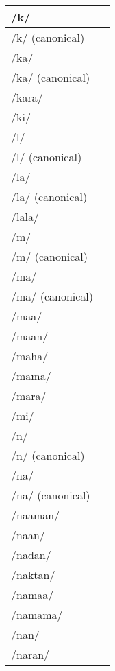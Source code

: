 \documentclass{article}
\begin{document}
\begin{longtable}{|l|p{}|}
/k/ & \textIndus{} \\ \hline
/k/ (canonical) & \textIndus{} \\ \hline
/ka/ & \textIndus{} \\ \hline
/ka/ (canonical) & \textIndus{} \\ \hline
/kara/ & \textIndus{} \\ \hline
/ki/ & \textIndus{} \\ \hline
/l/ & \textIndus{} \\ \hline
/l/ (canonical) & \textIndus{} \\ \hline
/la/ & \textIndus{} \\ \hline
/la/ (canonical) & \textIndus{} \\ \hline
/lala/ & \textIndus{} \\ \hline
/m/ & \textIndus{} \\ \hline
/m/ (canonical) & \textIndus{} \\ \hline
/ma/ & \textIndus{} \\ \hline
/ma/ (canonical) & \textIndus{} \\ \hline
/maa/ & \textIndus{} \\ \hline
/maan/ & \textIndus{} \\ \hline
/maha/ & \textIndus{} \\ \hline
/mama/ & \textIndus{} \\ \hline
/mara/ & \textIndus{} \\ \hline
/mi/ & \textIndus{} \\ \hline
/n/ & \textIndus{} \\ \hline
/n/ (canonical) & \textIndus{} \\ \hline
/na/ & \textIndus{} \\ \hline
/na/ (canonical) & \textIndus{} \\ \hline
/naaman/ & \textIndus{} \\ \hline
/naan/ & \textIndus{} \\ \hline
/nadan/ & \textIndus{} \\ \hline
/naktan/ & \textIndus{} \\ \hline
/namaa/ & \textIndus{} \\ \hline
/namama/ & \textIndus{} \\ \hline
/nan/ & \textIndus{} \\ \hline
/naran/ & \textIndus{} \\ \hline

\end{longtable}
\end{document}
